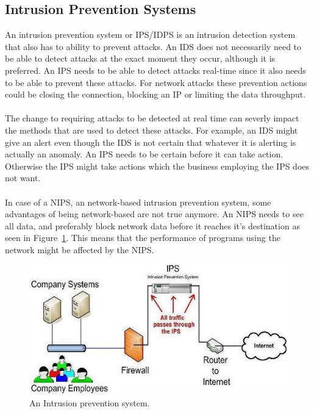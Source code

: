 \subsection{Intrusion Prevention Systems}
An intrusion prevention system or IPS/IDPS is an intrusion detection system that also has to ability to prevent attacks. An IDS does not necessarily need to be able to detect attacks at the exact moment they occur, although it is preferred. An IPS needs to be able to detect attacks real-time since it also needs to be able to prevent these attacks. For network attacks these prevention actions could be closing the connection, blocking an IP or limiting the data throughput.  \cite{sans2}\\
\\
The change to requiring attacks to be detected at real time can severly impact the methods that are used to detect these attacks. For example, an IDS might give an alert even though the IDS is not certain that whatever it is alerting is actually an anomaly. An IPS needs to be certain before it can take action. Otherwise the IPS might take actions which the business employing the IPS does not want.  \cite{sans2}\\
\\
In case of a NIPS, an network-based intrusion prevention system, some advantages of being network-based are not true anymore. An NIPS needs to see all data, and preferably block network data before it reaches it's destination as seen in Figure~\ref{fig:IPS}. This means that the performance of programs using the network might be affected by the NIPS. \cite{golling2014towards}

\begin{figure}[H]
\centering
\includegraphics[width=1\textwidth]{Figures/IDS_IPS}
\decoRule
\caption[Intrusion prevention system]{An Intrusion prevention system. \cite{ips1}}
\label{fig:IPS}
\end{figure}

